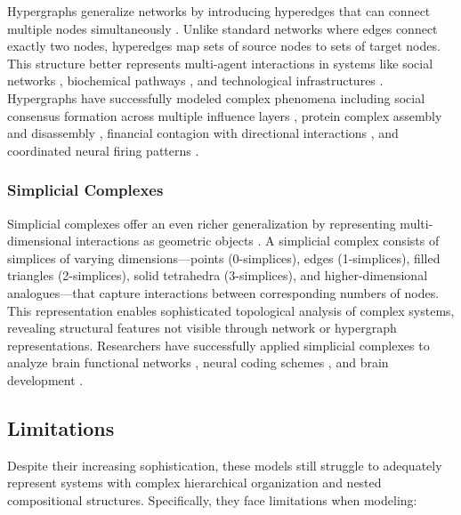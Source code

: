 Hypergraphs generalize networks by introducing hyperedges that can connect multiple nodes simultaneously \citep{berge1984hypergraphs, battiston2020networks}. Unlike standard networks where edges connect exactly two nodes, hyperedges map sets of source nodes to sets of target nodes. This structure better represents multi-agent interactions in systems like social networks \citep{zhou2007learning}, biochemical pathways \citep{klamt2009hypergraphs}, and technological infrastructures \citep{xu2013hypernetwork}. Hypergraphs have successfully modeled complex phenomena including social consensus formation across multiple influence layers \citep{neuhäuser2021consensus}, protein complex assembly and disassembly \citep{ramadan2020hypergraph}, financial contagion with directional interactions \citep{hüser2020financial}, and coordinated neural firing patterns \citep{petri2014homological}.

\subsubsection{Simplicial Complexes}

Simplicial complexes offer an even richer generalization by representing multi-dimensional interactions as geometric objects \citep{petri2014homological, giusti2016two, sizemore2018importance}. A simplicial complex consists of simplices of varying dimensions—points (0-simplices), edges (1-simplices), filled triangles (2-simplices), solid tetrahedra (3-simplices), and higher-dimensional analogues—that capture interactions between corresponding numbers of nodes. This representation enables sophisticated topological analysis of complex systems, revealing structural features not visible through network or hypergraph representations. Researchers have successfully applied simplicial complexes to analyze brain functional networks \citep{petri2014homological}, neural coding schemes \citep{giusti2016two}, and brain development \citep{sizemore2018importance}.

\subsection{Limitations}

Despite their increasing sophistication, these models still struggle to adequately represent systems with complex hierarchical organization and nested compositional structures. Specifically, they face limitations when modeling:


